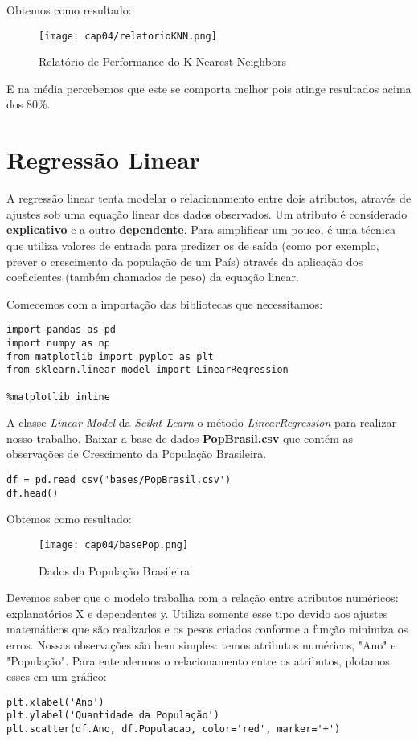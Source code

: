 Obtemos como resultado:
\begin{figure}[H]
	\centering
	\texttt{[image: cap04/relatorioKNN.png]}
	\caption{Relatório de Performance do K-Nearest Neighbors}
\end{figure}

E na média percebemos que este se comporta melhor pois atinge resultados acima dos 80\%.

\section{Regressão Linear}
A regressão linear tenta modelar o relacionamento entre dois atributos, através de ajustes sob uma equação linear dos dados observados. Um atributo é considerado \textbf{explicativo} e a outro \textbf{dependente}. Para simplificar um pouco, é uma técnica que utiliza valores de entrada para predizer os de saída (como por exemplo, prever o crescimento da população de um País) através da aplicação dos coeficientes (também chamados de peso) da equação linear. 

Comecemos com a importação das bibliotecas que necessitamos:
\begin{lstlisting}[]
import pandas as pd
import numpy as np
from matplotlib import pyplot as plt
from sklearn.linear_model import LinearRegression

%matplotlib inline
\end{lstlisting}

A classe \textit{Linear Model} da \textit{Scikit-Learn} o método \textit{LinearRegression} para realizar nosso trabalho. Baixar a base de dados \textbf{PopBrasil.csv} que contém as observações de Crescimento da População Brasileira.
\begin{lstlisting}[]
df = pd.read_csv('bases/PopBrasil.csv')
df.head()
\end{lstlisting}

Obtemos como resultado:
\begin{figure}[H]
	\centering
	\texttt{[image: cap04/basePop.png]}
	\caption{Dados da População Brasileira}
\end{figure}

Devemos saber que o modelo trabalha com a relação entre atributos numéricos: explanatórios X e dependentes y. Utiliza somente esse tipo devido aos ajustes matemáticos que são realizados e os pesos criados conforme a função minimiza os erros. Nossas observações são bem simples: temos atributos numéricos, "Ano" e "População". Para entendermos o relacionamento entre os atributos, plotamos esses em um gráfico:
\begin{lstlisting}[]
plt.xlabel('Ano')
plt.ylabel('Quantidade da População')
plt.scatter(df.Ano, df.Populacao, color='red', marker='+')
\end{lstlisting}

